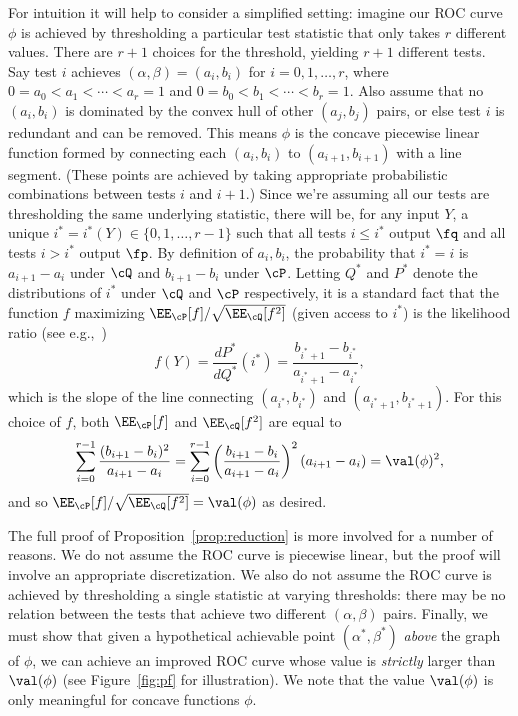 \documentclass[11pt]{article}
\begin{document}
For intuition it will help to consider a simplified setting: imagine our ROC curve $\phi$ is achieved by thresholding a particular test statistic that only takes $r$ different values. There are $r+1$ choices for the threshold, yielding $r+1$ different tests. Say test $i$ achieves $(\alpha,\beta) = (a_i,b_i)$ for $i = 0,1,\ldots,r$, where $0 = a_0 < a_1 < \cdots < a_r = 1$ and $0 = b_0 < b_1 < \cdots < b_r = 1$. Also assume that no $(a_i,b_i)$ is dominated by the convex hull of other $(a_j,b_j)$ pairs, or else test $i$ is redundant and can be removed. This means $\phi$ is the concave piecewise linear function formed by connecting each $(a_i,b_i)$ to $(a_{i+1},b_{i+1})$ with a line segment. (These points are achieved by taking appropriate probabilistic combinations between tests $i$ and $i+1$.) Since we're assuming all our tests are thresholding the same underlying statistic, there will be, for any input $Y$, a unique $i^* = i^*(Y) \in \{0,1,\ldots,r-1\}$ such that all tests $i \le i^*$ output $\fq$ and all tests $i > i^*$ output $\fp$. By definition of $a_i,b_i$, the probability that $i^* = i$ is $a_{i+1} - a_i$ under $\cQ$ and $b_{i+1} - b_i$ under $\cP$. Letting $Q^*$ and $P^*$ denote the distributions of $i^*$ under $\cQ$ and $\cP$ respectively, it is a standard fact that the function $f$ maximizing $\EE_{\cP}[f]/\sqrt{\EE_{\cQ}[f^2]}$ (given access to $i^*$) is the likelihood ratio (see e.g.,~\cite[Proposition~1.9]{ld-notes})
\[ f(Y) = \frac{dP^*}{dQ^*}(i^*) = \frac{b_{i^*+1} - b_{i^*}}{a_{i^*+1} - a_{i^*}}, \]
which is the slope of the line connecting $(a_{i^*},b_{i^*})$ and $(a_{i^*+1},b_{i^*+1})$. For this choice of $f$, both $\EE_{\cP}[f]$ and $\EE_{\cQ}[f^2]$ are equal to
\[ \sum_{i=0}^{r-1} \frac{(b_{i+1}-b_i)^2}{a_{i+1}-a_i} = \sum_{i=0}^{r-1} \left(\frac{b_{i+1}-b_i}{a_{i+1}-a_i}\right)^2 (a_{i+1}-a_i) = \val(\phi)^2, \]
and so $\EE_{\cP}[f]/\sqrt{\EE_{\cQ}[f^2]} = \val(\phi)$ as desired.

The full proof of Proposition~\ref{prop:reduction} is more involved for a number of reasons. We do not assume the ROC curve is piecewise linear, but the proof will involve an appropriate discretization. We also do not assume the ROC curve is achieved by thresholding a single statistic at varying thresholds: there may be no relation between the tests that achieve two different $(\alpha,\beta)$ pairs. Finally, we must show that given a hypothetical achievable point $(\alpha^*,\beta^*)$ \emph{above} the graph of $\phi$, we can achieve an improved ROC curve whose value is \emph{strictly} larger than $\val(\phi)$ (see Figure~\ref{fig:pf} for illustration). We note that the value $\val(\phi)$ is only meaningful for concave functions $\phi$.
\end{document}
